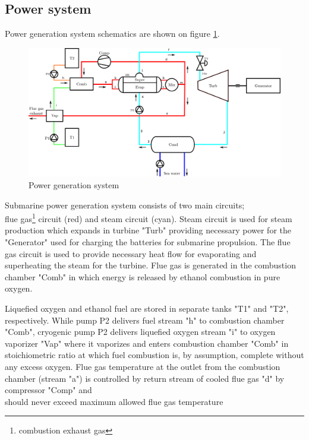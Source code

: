 \documentclass{article}
\begin{document}
	
	
	\subsection{Power system}
	
	Power generation system schematics are shown on figure \ref{fig:pwr_scheme}.
	
	\begin{figure}[h!]
		\centering
		\includegraphics[width=\textwidth]{terma.png}
		\caption{Power generation system}
		\label{fig:pwr_scheme}
	\end{figure}
	
	Submarine power generation system consists of two main circuits; \\
	flue gas\footnote{combustion exhaust gas} circuit (red) and steam 
	circuit (cyan). 
	Steam circuit is used for steam production which expands in turbine "Turb" 
	providing necessary power for the "Generator" used for charging the 
	batteries for submarine propulsion. The flue gas circuit is used to provide 
	necessary heat flow for evaporating and superheating the steam for the 
	turbine. Flue gas is generated in the combustion chamber "Comb" in which 
	energy is released by ethanol combustion in pure oxygen.
	
	Liquefied oxygen and ethanol fuel are stored in separate tanks "T1" and 
	"T2", respectively. While pump P2 delivers fuel stream "h" to combustion 
	chamber "Comb", cryogenic pump P2 delivers liquefied oxygen stream "i" to 
	oxygen vaporizer "Vap" where it vaporizes and enters combustion chamber 
	"Comb" in stoichiometric ratio at which fuel combustion is, by assumption, 
	complete without any excess oxygen. Flue gas temperature at the outlet from 
	the combustion chamber (stream "a") is controlled by return stream of 
	cooled flue gas "d" by compressor "Comp" and\\
	 should never exceed maximum allowed flue gas temperature %
	
\end{document}
